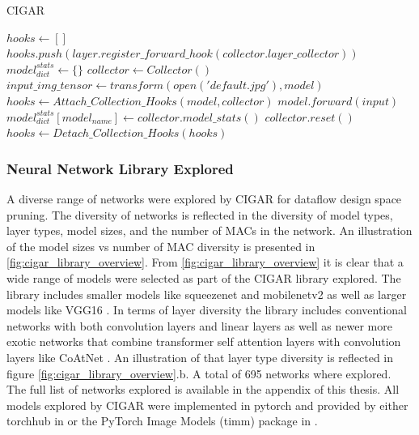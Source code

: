 \begin{algorithm}[H] 
    \caption{\ac{CIGAR}}
    \label{alg:cigar_algo}
    \begin{algorithmic}[1]
    \Statex
        \State $hooks \gets []$
                \State $hooks.push(layer.register\_forward\_hook(collector.layer\_collector))$
            \EndIf 
        \EndFor
    \State {}    
    \EndFunction
    \Statex
        \State $model^{stats}_{dict} \gets \{\}$
        \State $collector \gets Collector()$
            \State $input\_img\_tensor \gets transform(open('default.jpg'), model)$
            \State $hooks \gets Attach\_Collection\_Hooks(model, collector)$
            \State $model.forward(input)$
            \State $model^{stats}_{dict}[model_{name}] \gets collector.model\_stats()$
            \State $collector.reset()$
            \State $hooks \gets Detach\_Collection\_Hooks(hooks)$
        \EndFor
        \State {}
    \EndFunction
    \end{algorithmic}
\end{algorithm}

\subsubsection{Neural Network Library Explored}
\label{chap:dda:dataflow_dse:pruning:cigar:library}

A diverse range of networks were explored by CIGAR for dataflow design space
pruning. The diversity of networks is reflected in the diversity of model types,
layer types, model sizes, and the number of MACs in the network. An illustration
of the model sizes vs number of MAC diversity is presented in
\autoref{fig:cigar_library_overview}. From \autoref{fig:cigar_library_overview}
it is clear that a wide range of models were selected as part of the CIGAR
library explored. The library includes smaller models like squeezenet and
mobilenetv2 as well as larger models like VGG16 \cite{dnn_is_sota_image}.
In terms of layer diversity the library includes conventional networks with both
convolution layers and linear layers as well as newer more exotic networks that
combine transformer self attention layers with convolution layers like CoAtNet
\cite{xu_co-scale_2021}. An illustration of that layer type diversity is
reflected in figure \autoref{fig:cigar_library_overview}.b. A total of 695 networks where explored.
The full list of networks explored is available in the
appendix of this thesis. All models explored by CIGAR were implemented in
pytorch and provided by either torchhub in \cite{pytorch} or the PyTorch Image
Models (timm) package in \cite{timm}.  

